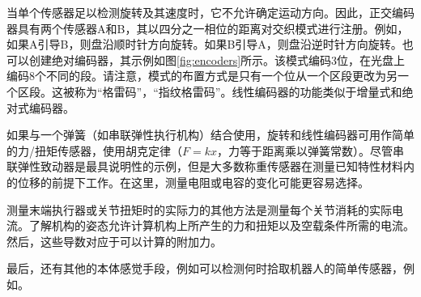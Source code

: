 

 
当单个传感器足以检测旋转及其速度时，它不允许确定运动方向。因此，正交编码器具有两个传感器A和B，其以四分之一相位的距离对交织模式进行注册。例如，如果A引导B，则盘沿顺时针方向旋转。如果B引导A，则盘沿逆时针方向旋转。也可以创建绝对编码器，其示例如图\ref{fig:encoders}所示。该模式编码3位，在光盘上编码8个不同的段。请注意，模式的布置方式是只有一个位从一个区段更改为另一个区段。这被称为“格雷码”，“指纹格雷码”。线性编码器的功能类似于增量式和绝对式编码器。

如果与一个弹簧（如串联弹性执行机构）结合使用，旋转和线性编码器可用作简单的力/扭矩传感器，使用胡克定律（$F=kx$，力等于距离乘以弹簧常数）。尽管串联弹性致动器是最具说明性的示例，但是大多数称重传感器在测量已知特性材料内的位移的前提下工作。在这里，测量电阻或电容的变化可能更容易选择。

测量末端执行器或关节扭矩时的实际力的其他方法是测量每个关节消耗的实际电流。了解机构的姿态允许计算机构上所产生的力和扭矩以及空载条件所需的电流。然后，这些导数对应于可以计算的附加力。

最后，还有其他的本体感觉手段，例如可以检测何时拾取机器人的简单传感器，例如。



